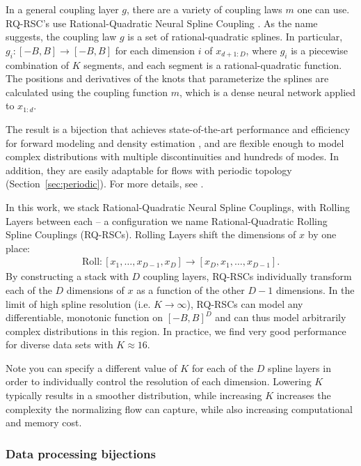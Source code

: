 \documentclass[twocolumn,twocolappendix]{aastex631}
\begin{document}
In a general coupling layer $g$, there are a variety of coupling laws $m$ one can use.
RQ-RSC's use Rational-Quadratic Neural Spline Coupling \citep{durkan2019}.
As the name  suggests, the coupling law $g$ is a set of rational-quadratic splines.
In particular, $g_i: [-B, B] \to [-B, B]$ for each dimension $i$ of $x_{d+1:D}$, where $g_i$ is a piecewise combination of $K$ segments, and each segment is a rational-quadratic function.
The positions and derivatives of the knots that parameterize the splines are calculated using the coupling function $m$, which is a dense neural network applied to $x_{1:d}$.

The result is a bijection that achieves state-of-the-art performance and efficiency for forward modeling and density estimation \citep{kobyzev2020}, and are flexible enough to model complex distributions with multiple discontinuities and hundreds of modes.
In addition, they are easily adaptable for flows with periodic topology (Section~\ref{sec:periodic}).
For more details, see \citet{durkan2019}.

In this work, we stack Rational-Quadratic Neural Spline Couplings, with Rolling Layers between each -- a configuration we name Rational-Quadratic Rolling Spline Couplings (RQ-RSCs).
Rolling Layers shift the dimensions of $x$ by one place:
\begin{align}
    \mathrm{Roll}: [x_1, \dots , x_{D-1}, x_D] \to [x_D, x_1, \dots , x_{D-1}].
\end{align}
By constructing a stack with $D$ coupling layers, RQ-RSCs individually transform each of the $D$ dimensions of $x$ as a function of the other $D-1$ dimensions.
In the limit of high spline resolution (i.e. $K \to \infty$), RQ-RSCs can model any differentiable, monotonic function on $[-B, B]^D$ and can thus model arbitrarily complex distributions in this region.
In practice, we find very good performance for diverse data sets with $K \approx 16$.

Note you can specify a different value of $K$ for each of the $D$ spline layers in order to individually control the resolution of each dimension.
Lowering $K$ typically results in a smoother distribution, while increasing $K$ increases the complexity the normalizing flow can capture, while also increasing computational and memory cost.

\subsubsection{Data processing bijections}
\label{sec:data-processing}
\end{document}
